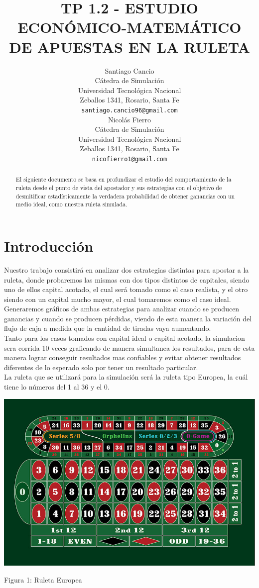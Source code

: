 \documentclass{article}
\title{TP 1.2 - ESTUDIO ECONÓMICO-MATEMÁTICO DE APUESTAS EN LA RULETA}
\author{
 Santiago Cancio \\
  Cátedra de Simulación\\
  Universidad Tecnológica Nacional\\
  Zeballos 1341, Rosario, Santa Fe \\
  \texttt{santiago.cancio96@gmail.com} \\
   \And
 Nicolás Fierro \\
  Cátedra de Simulación\\
  Universidad Tecnológica Nacional \\
  Zeballos 1341, Rosario, Santa Fe\\
  \texttt{nicofierro1@gmail.com} \\
}
\begin{document}
\maketitle
\begin{abstract}
El siguiente documento se basa en profundizar el estudio del comportamiento de la ruleta desde el punto de vista del apostador y sus estrategias con el objetivo de desmitificar estadísticamente la verdadera probabilidad de obtener ganancias con un medio ideal, como nuestra ruleta simulada.
\end{abstract}




\section{Introducción}
Nuestro trabajo consistirá en analizar dos estrategias distintas para apostar a la ruleta, donde probaremos las mismas con dos tipos distintos de capitales, siendo uno de ellos capital acotado, el cual será tomado como el caso realista, y el otro siendo con un capital mucho mayor, el cual tomaremos como el caso ideal. Generaremos gráficos de ambas estrategias para analizar cuando se producen ganancias y cuando se producen pérdidas, viendo de esta manera la variación del flujo de caja a medida que la cantidad de tiradas vaya aumentando.\\

Tanto para los casos tomados con capital ideal o capital acotado, la simulacion sera corrida 10 veces graficando de manera simultanea los resultados, para de esta manera lograr conseguir resultados mas confiables y evitar obtener resultados diferentes de lo esperado solo por tener un resultado particular.\\

La ruleta que se utilizará para la simulación será la ruleta tipo Europea, la cuál tiene lo números del 1 al 36 y el 0.

\begin{center}
    \includegraphics[width=0.5\linewidth]{Ruleta-Europea-Imagen.jpg}
    
    \caption{Figura 1: Ruleta Europea}
\end{center}
\end{document}
